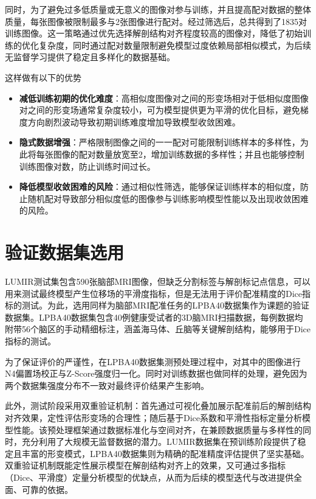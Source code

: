 同时，为了避免过多低质量或无意义的图像对参与训练，并且提高配对数据的整体质量，每张图像被限制最多与2张图像进行配对。经过筛选后，总共得到了1835对训练图像。这一策略通过优先选择解剖结构对齐程度较高的图像对，降低了初始训练的优化复杂度，同时通过配对数量限制避免模型过度依赖局部相似模式，为后续无监督学习提供了稳定且多样化的数据基础。

这样做有以下的优势

\begin{itemize}
    \item \textbf{减低训练初期的优化难度}：高相似度图像对之间的形变场相对于低相似度图像对之间的形变场通常复杂度较小，可为模型提供更为平滑的优化目标，避免梯度方向剧烈波动导致初期训练难度增加导致模型收敛困难。
    \item \textbf{隐式数据增强}：严格限制图像之间的一一配对可能限制训练样本的多样性，为此将每张图像的配对数量放宽至2，增加训练数据的多样性；并且也能够控制训练图像对数，防止训练时间过长。
    \item \textbf{降低模型收敛困难的风险}：通过相似性筛选，能够保证训练样本的相似度，防止随机配对导致部分相似度低的图像参与训练影响模型性能以及出现收敛困难的风险。
\end{itemize}

\section{验证数据集选用}

LUMIR测试集包含590张脑部MRI图像，但缺乏分割标签与解剖标记点信息，可以用来测试最终模型产生位移场的平滑度指标，但是无法用于评价配准精度的Dice指标的测试。为此，选用同样为脑部MRI配准任务的LPBA40数据集作为课题的验证数据集。LPBA40数据集包含40例健康受试者的3D脑MRI扫描数据，每例数据均附带56个脑区的手动精细标注，涵盖海马体、丘脑等关键解剖结构，能够用于Dice指标的测试。

为了保证评价的严谨性，在LPBA40数据集测预处理过程中，对其中的图像进行N4偏置场校正与Z-Score强度归一化。同时对训练数据也做同样的处理，避免因为两个数据集强度分布不一致对最终评价结果产生影响。

此外，测试阶段采用双重验证机制：首先通过可视化叠加展示配准前后的解剖结构对齐效果，定性评估形变场的合理性；随后基于Dice系数和平滑性指标定量分析模型性能。该预处理框架通过数据标准化与空间对齐，在兼顾数据质量与多样性的同时，充分利用了大规模无监督数据的潜力。LUMIR数据集在预训练阶段提供了稳定且丰富的形变模式，LPBA40数据集则为精确的配准精度评估提供了坚实基础。双重验证机制既能定性展示模型在解剖结构对齐上的效果，又可通过多指标（Dice、平滑度）定量分析模型的优缺点，从而为后续的模型迭代与改进提供全面、可靠的依据。

